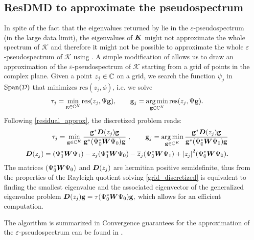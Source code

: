 \subsection{ResDMD to approximate the pseudospectrum}
In spite of the fact that the eigenvalues returned by  lie in the $\varepsilon$-pseudospectrum (in the large data limit), the eigenvalues of $\vb*{K}$ might not approximate the whole spectrum of $\mathcal{K}$ and therefore it might not be possible to approximate the whole $\varepsilon$-pseudospectrum of $\mathcal{K}$ using . A simple modification of  allows us to draw an approximation of the $\varepsilon$-pseudospectrum of $\mathcal{K}$ starting from a grid of points in the complex plane. Given a point $z_j\in\mathbb{C}$ on a grid, we search the function $\psi_j$ in $\mathrm{Span}(\mathcal{D})$ that minimizes $\mathrm{res}(z_j, \phi)$, i.e. we solve
\begin{equation}
    \label{grid_continuous}
    \tau_j = \min_{\vb{g}\in\mathbb{C}^K} \mathrm{res}(z_j, \Psi\vb{g}), \qquad \vb{g}_j = \operatorname*{arg\,min}_{\vb{g}\in\mathbb{C}^K} \mathrm{res}(z_j, \Psi\vb{g}).
\end{equation}
Following \eqref{residual_approx}, the discretized problem reads:
\begin{align}
    \label{grid_discretized}
    \tau_j = \min_{\vb{g}\in\mathbb{C}^K} \frac{\vb{g}^*\vb*{D}(z_j)\vb{g}}{\vb{g}^*(\Psi_0^*\vb*{W}\Psi_0)\vb{g}}\,\,, \qquad \vb{g}_j = \operatorname*{arg\,min}_{\vb{g}\in\mathbb{C}^K} \frac{\vb{g}^*\vb*{D}(z_j)\vb{g}}{\vb{g}^*(\Psi_0^*\vb*{W}\Psi_0)\vb{g}} \\
    \label{D(z)_definition}
    \vb*{D}(z_j) = (\Psi_1^*\vb*{W}\Psi_1) - z_j (\Psi_1^*\vb*{W}\Psi_0) - \overline{z}_j(\Psi_0^*\vb*{W}\Psi_1) + \abs{z_j}^2 (\Psi_0^*\vb*{W}\Psi_0).
\end{align}
The matrices $(\Psi_0^*\vb*{W}\Psi_0)$ and $\vb*{D}(z_j)$ are hermitian positive semidefinite, thus from the properties of the Rayleigh quotient solving \eqref{grid_discretized} is equivalent to finding the smallest eigenvalue and the associated eigenvector of the generalized eigenvalue problem $\vb*{D}(z_j)\vb{g} = \tau(\Psi_0^*\vb*{W}\Psi_0)\vb{g}$, which allows for an efficient computation.

The algorithm is summarized in  Convergence guarantees for the approximation of the $\varepsilon$-pseudospectrum can be found in \cite{colbrook_rigorous_2021}.

